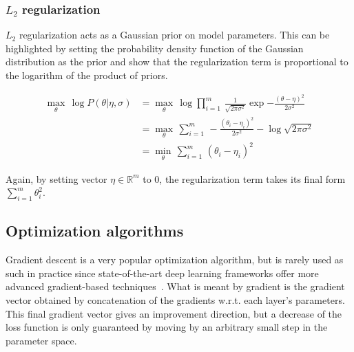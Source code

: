 	\subsubsection{$L_2$ regularization}\label{l2regularization}

	   $L_2$ regularization acts as a Gaussian prior on model parameters.
	   This can be highlighted by setting the probability density function of the Gaussian
	   distribution as the prior and show that the regularization term is proportional
	   to the logarithm of the product of priors.

	   \begin{align}
               \max_{\theta}\, \log{P(\theta \vert \eta, \sigma)}
		   & = \max_{\theta}\, \log{\prod\limits_{i=1}^m \, \frac{1}{\sqrt{2\pi\sigma^2}}
		   \exp{-\frac{(\theta - \eta)^2}{2\sigma^2}}} \\
		   & = \max_{\theta}\, \sum\limits_{i=1}^m \, -\frac{(\theta_i - \eta_i)^2}{2\sigma^2}
		   - \log{\sqrt{2\pi\sigma^2}} \\
		   & = \min_{\theta}\, \sum\limits_{i=1}^m \, (\theta_i - \eta_i)^2
           \end{align}

	   Again, by setting vector $\eta \in \mathbb{R}^m$ to $0$, the regularization term takes its
	   final form $\sum\limits_{i=1}^m \theta_i^2$.

    \subsection{Optimization algorithms} \label{opti}

        Gradient descent is a very popular optimization algorithm,
        but is rarely used as such in practice since state-of-the-art deep learning
        frameworks offer more advanced gradient-based techniques~\cite{DBLP:journals/corr/Ruder16}.
        What is meant by gradient is the gradient vector obtained by concatenation of the gradients
        w.r.t. each layer's parameters. This final gradient vector
        gives an improvement direction, but a decrease of the loss function
        is only guaranteed by moving by an arbitrary small step in the parameter space.

